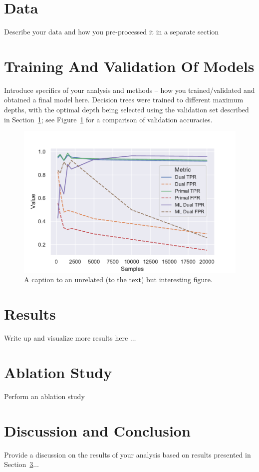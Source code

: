 \documentclass[twoside,11pt]{article}
\begin{document}
\section{Data}
\label{sec:data}
Describe your data and how you pre-processed it in a separate section


\section{Training And Validation Of Models}
\label{sec:methods}
Introduce specifics of your analysis and methods -- how you trained/validated and obtained a final model here. Decision trees \citep{breiman1984classification} were trained to different maximum depths, with the optimal depth being selected using the validation set described in Section~\ref{sec:data}; see Figure~\ref{fig:validation} for a comparison of validation accuracies.

\begin{figure}[!t]
	\centering
	\includegraphics[width=0.5\linewidth]{figures/combined_verma_tests.pdf}
	\caption{A caption to an unrelated (to the text) but interesting figure.}
	\label{fig:validation}
\end{figure}




\section{Results}
\label{sec:results}
Write up and visualize more results here $\dots$


\section{Ablation Study}
\label{sec:ablation}
Perform an ablation study

\section{Discussion and Conclusion}
\label{sec:discussion}
Provide a discussion on the results of your analysis based on results presented in Section~\ref{sec:results}$\dots$


\newpage

\end{document}
